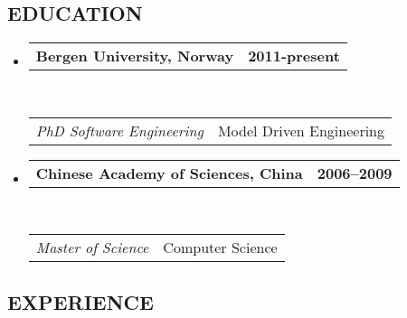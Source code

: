 \documentclass[12pt,letterpaper]{article}
\makeatletter
\newcommand{\headrows}[2]
{\begin{tabular*}{\linewidth}{l@{\extracolsep{\fill}}r}
	#1 &
	#2 \\
\end{tabular*}}
\makeatother
\begin{document}
\subsection*{\color{shade}EDUCATION}
\begin{itemize}[leftmargin=*]
    \parskip=0em
    \item
    \headrows
    {\textbf{Bergen University, Norway}}
    {\textbf{2011-present}}
    \\\vspace{-0.2em}
    \headrows
    {\emph{PhD Software Engineering}}{Model Driven Engineering}

\end{itemize}
\vspace{-0.8em}
\begin{itemize}[leftmargin=*]
    \parskip=0.2em
    \item
    \headrows
    {\textbf{Chinese Academy of Sciences, China}}
    {\textbf{2006--2009}}
    \\
    \headrows
    {\emph{Master of Science}}{Computer Science}
\end{itemize}
\vspace{-0.5em}
\subsection*{\color{shade}EXPERIENCE}
\end{document}
